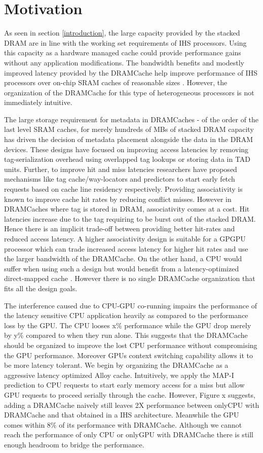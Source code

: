\section{Motivation} \label{motivation}
As seen in section \ref{introduction}, the large capacity provided by the stacked DRAM are in line with the working set requirements of IHS processors. Using this capacity as a hardware managed cache could provide performance gains without any application modifications. The bandwidth benefits and modestly improved latency provided by the DRAMCache help improve performance of IHS processors over on-chip SRAM caches of reasonable sizes \cite{amd-exascale1}. However, the organization of the DRAMCache for this type of heterogeneous processors is not immediately intuitive.
\par The large storage requirement for metadata in DRAMCaches - of the order of the last level SRAM caches, for merely hundreds of MBs of stacked DRAM capacity has driven the decision of metadata placement alongside the data in the DRAM devices. These designs have focused on improving access latencies by removing tag-serialization overhead using overlapped tag lookups or storing data in TAD units. Further, to improve hit and miss latencies researchers have proposed mechanisms like tag cache/way-locators and predictors to start early fetch requests based on cache line residency respectively. Providing associativity is known to improve cache hit rates by reducing conflict misses. However in DRAMCaches where tag is stored in DRAM,  associativity comes at a cost. Hit latencies increase due to the tag requiring to be burst out of the stacked DRAM. Hence there is an implicit trade-off between providing better hit-rates and reduced access latency. A higher associativity design is suitable for a GPGPU processor which can trade increased access latency for higher hit rates and use the larger bandwidth of the DRAMCache. On the other hand, a CPU would suffer when using such a design but would benefit from a latency-optimized direct-mapped cache \cite{alloy}. However there is no single DRAMCache organization that fits all the design goals. 
\par The interference caused due to CPU-GPU co-running impairs the performance of the latency sensitive CPU application heavily as compared to the performance loss by the GPU. The CPU looses x\% performance while the GPU drop merely by y\% compared to when they run alone. This suggests that the DRAMCache should be organized to improve the lost CPU performance without compromising the GPU performance. Moreover GPUs context switching capability allows it to be more latency tolerant.  We begin by organizing the DRAMCache as a aggressive latency optimized  Alloy cache. Intuitively, we apply the MAP-I prediction to CPU requests to start early memory access for a miss but allow GPU requests to proceed serially through the cache. However, Figure x suggests, adding a DRAMCache naively still leaves 2X performance between onlyCPU with DRAMCache and that obtained in a IHS architecture. Meanwhile the GPU comes within 8\% of its performance with DRAMCache. Although we cannot reach the performance of only CPU or onlyGPU with DRAMCache there is still enough headroom to bridge the performance.

